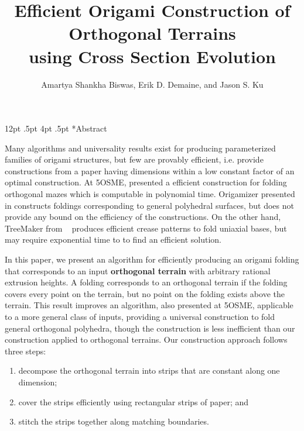 \documentclass[a4paper,11pt]{article}
\title{Efficient Origami Construction of Orthogonal Terrains \\
using Cross Section Evolution}
\author{Amartya Shankha Biswas, Erik D. Demaine, 
and Jason S. Ku}
\makeatletter
\renewcommand\section{\@startsection {section}{1}{\z@}%
                                   {12pt \@plus .5pt}%
                                   {4pt \@plus.5pt}%
                                   {\centering\normalfont\bfseries}}
\makeatother
\begin{document}
\maketitle


\section*{Abstract}

Many algorithms and universality results exist for producing parameterized
families of origami structures, but few are provably efficient, i.e. provide
constructions from a paper having dimensions within a low constant factor of an
optimal construction. At 5OSME, \cite{MazeFolding_Origami5} presented a
efficient construction for folding orthogonal mazes which is computable in
polynomial time. Origamizer presented in \cite{Origamizer_SoCG2017} constructs
foldings corresponding to general polyhedral surfaces, but does not provide any
bound on the efficiency of the constructions. On the other hand, TreeMaker from
~\cite{Lang} produces efficient crease patterns to fold uniaxial bases, but may
require exponential time to to find an efficient solution. 

In this paper, we present an algorithm for efficiently producing an origami
folding that corresponds to an input {\bf orthogonal terrain} with arbitrary
rational extrusion heights. A folding corresponds to an orthogonal terrain if
the folding covers every point on the terrain, but no point on the folding
exists above the terrain. This result improves an algorithm,
\cite{BoxPleating_Origami5} also presented at 5OSME, applicable to a more
general class of inputs, providing a universal construction to fold general
orthogonal polyhedra, though the construction is less inefficient than our
construction applied to orthogonal terrains. Our construction approach follows
three steps: 

\vspace{-0.2pc} 
\begin{enumerate} 
\item decompose the orthogonal terrain into strips that are constant along one
dimension; 
\item cover the strips efficiently using rectangular strips of paper; and 
\item stitch the strips together along matching boundaries. 
\end{enumerate}
\vspace{-0.2pc}
\end{document}
